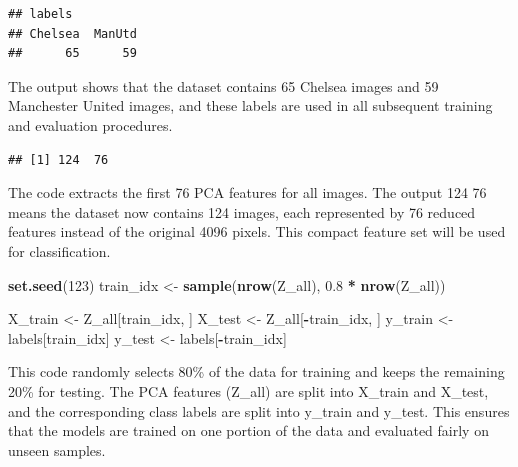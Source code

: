 \documentclass[
]{article}
\newenvironment{Shaded}{\begin{snugshade}}{\end{snugshade}}
\newcommand{\DecValTok}[1]{\textcolor[rgb]{0.00,0.00,0.81}{#1}}
\newcommand{\FloatTok}[1]{\textcolor[rgb]{0.00,0.00,0.81}{#1}}
\newcommand{\FunctionTok}[1]{\textcolor[rgb]{0.13,0.29,0.53}{\textbf{#1}}}
\newcommand{\NormalTok}[1]{#1}
\newcommand{\OtherTok}[1]{\textcolor[rgb]{0.56,0.35,0.01}{#1}}
\newcommand{\SpecialCharTok}[1]{\textcolor[rgb]{0.81,0.36,0.00}{\textbf{#1}}}
\begin{document}
\begin{verbatim}
## labels
## Chelsea  ManUtd 
##      65      59
\end{verbatim}

The output shows that the dataset contains 65 Chelsea images and 59
Manchester United images, and these labels are used in all subsequent
training and evaluation procedures.

\begin{Shaded}
\end{Shaded}

\begin{verbatim}
## [1] 124  76
\end{verbatim}

The code extracts the first 76 PCA features for all images. The output
124 76 means the dataset now contains 124 images, each represented by 76
reduced features instead of the original 4096 pixels. This compact
feature set will be used for classification.

\begin{Shaded}
\begin{Highlighting}[]
\FunctionTok{set.seed}\NormalTok{(}\DecValTok{123}\NormalTok{)}
\NormalTok{train\_idx }\OtherTok{\textless{}{-}} \FunctionTok{sample}\NormalTok{(}\FunctionTok{nrow}\NormalTok{(Z\_all), }\FloatTok{0.8} \SpecialCharTok{*} \FunctionTok{nrow}\NormalTok{(Z\_all))}

\NormalTok{X\_train }\OtherTok{\textless{}{-}}\NormalTok{ Z\_all[train\_idx, ]}
\NormalTok{X\_test  }\OtherTok{\textless{}{-}}\NormalTok{ Z\_all[}\SpecialCharTok{{-}}\NormalTok{train\_idx, ]}
\NormalTok{y\_train }\OtherTok{\textless{}{-}}\NormalTok{ labels[train\_idx]}
\NormalTok{y\_test  }\OtherTok{\textless{}{-}}\NormalTok{ labels[}\SpecialCharTok{{-}}\NormalTok{train\_idx]}
\end{Highlighting}
\end{Shaded}

This code randomly selects 80\% of the data for training and keeps the
remaining 20\% for testing. The PCA features (Z\_all) are split into
X\_train and X\_test, and the corresponding class labels are split into
y\_train and y\_test. This ensures that the models are trained on one
portion of the data and evaluated fairly on unseen samples.
\end{document}
